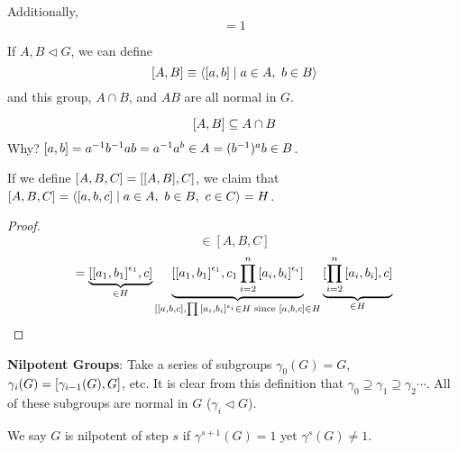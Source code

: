\documentclass[a4paper,twoside,master.tex]{subfiles}
\begin{document}
Additionally,
\begin{equation}
    [a,b,c^a][c,a,b^c][b,c,a^b] = 1\tag{Hall's Identity}
\end{equation}

If $ A,B \triangleleft G $, we can define
\begin{equation}
    \comm{A}{B} \equiv \ev{\comm{a}{b} \mid a \in A,\ b \in B}
\end{equation}
and this group, $ A \cap B $, and $ AB $ are all normal in $ G $.

\begin{equation}
    \comm{A}{B} \subseteq A \cap B
\end{equation}
Why? $ \comm{a}{b} = a^{-1} b^{-1} a b = a^{-1} a^b \in A = (b^{-1})^a b \in B $.

If we define $ [A,B,C] = [\comm{A}{B}, C] $, we claim that $ [A,B,C] = \ev{[a,b,c]\mid a \in A,\ b \in B,\ c \in C} = H $.
\begin{proof}
    \begin{equation}
        [a,b,c] \in [A,B,C]
    \end{equation}
    \begin{equation}
        [ \prod_{i=1}^{n} \comm{a_i}{b_i}^{\epsilon_i}, c] = \underbrace{[\comm{a_1}{b_1}^{\epsilon_1}, c]}_{\in H}\underbrace{[\comm{a_1}{b_1}^{\epsilon_1}, c_1 \prod_{i=2}^{n} \comm{a_i}{b_i}^{\epsilon_i}]}_{[ [a,b,c], \prod \comm{a_i}{b_i}^{\epsilon_i} \in H \text{ since } [a,b,c] \in H}\underbrace{[\prod_{i=2}^{n} \comm{a_i}{b_i}, c]}_{\in H}
    \end{equation}
\end{proof}


\begin{definition}
    \textbf{Nilpotent Groups}: Take a series of subgroups $ \gamma_0(G) = G $, $ \gamma_i(G) = \comm{\gamma_{i - 1}(G)}{G} $, etc. It is clear from this definition that $ \gamma_0 \supseteq \gamma_1 \supseteq \gamma_2 \cdots $. All of these subgroups are normal in $ G $ ($ \gamma_i \triangleleft G $).

    We say $ G $ is nilpotent of step $ s $ if $ \gamma^{s+1}(G) = 1 $ yet $ \gamma^s(G) \neq 1 $.
\end{definition}
\end{document}
